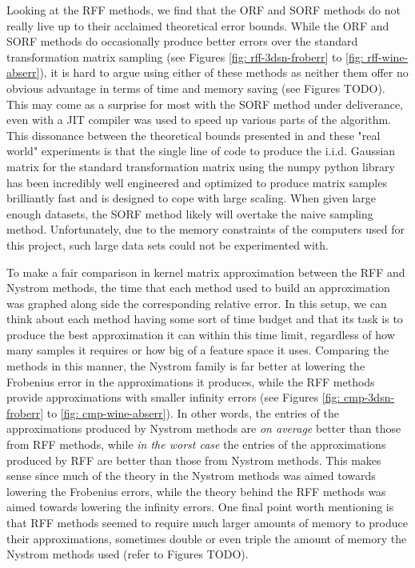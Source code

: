 Looking at the RFF methods, we find that the ORF and SORF methods do not really live up to their acclaimed theoretical error bounds. While the ORF and SORF methods do occasionally produce better errors over the standard transformation matrix sampling (see Figures \ref{fig: rff-3dsn-froberr} to \ref{fig: rff-wine-abserr}), it is hard to argue using either of these methods as neither them offer no obvious advantage in terms of time and memory saving (see Figures TODO). This may come as a surprise for most with the SORF method under deliverance, even with a JIT compiler was used to speed up various parts of the algorithm. This dissonance between the theoretical bounds presented in  and these "real world" experiments is that the single line of code to produce the i.i.d. Gaussian matrix for the standard transformation matrix using the numpy python library has been incredibly well engineered and optimized to produce matrix samples brilliantly fast and is designed to cope with large scaling. When given large enough datasets, the SORF method likely will overtake the naive sampling method. Unfortunately, due to the memory constraints of the computers used for this project, such large data sets could not be experimented with.

To make a fair comparison in kernel matrix approximation between the RFF and Nystrom methods, the time that each method used to build an approximation was graphed along side the corresponding relative error. In this setup, we can think about each method having some sort of time budget and that its task is to produce the best approximation it can within this time limit, regardless of how many samples it requires or how big of a feature space it uses. Comparing the methods in this manner, the Nystrom family is far better at lowering the Frobenius error in the approximations it produces, while the RFF methods provide approximations with smaller infinity errors (see Figures \ref{fig: cmp-3dsn-froberr} to \ref{fig: cmp-wine-abserr}). In other words, the entries of the approximations produced by Nystrom methods are {\it on average} better than those from RFF methods, while {\it in the worst case} the entries of the approximations produced by RFF are better than those from Nystrom methods. This makes sense since much of the theory in the Nystrom methods was aimed towards lowering the Frobenius errors, while the theory behind the RFF methods was aimed towards lowering the infinity errors. One final point worth mentioning is that RFF methods seemed to require much larger amounts of memory to produce their approximations, sometimes double or even triple the amount of memory the Nystrom methods used (refer to Figures TODO).

